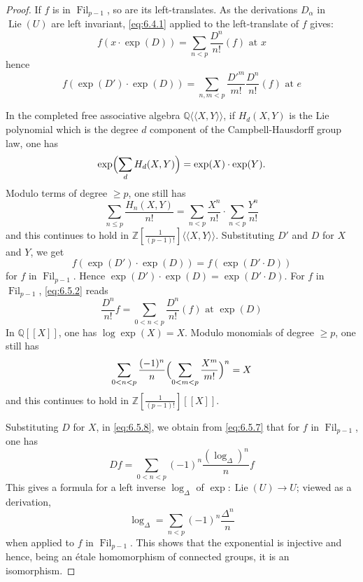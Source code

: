 \documentclass[11pt,a4paper]{article}
\theoremstyle{plain}
\theoremstyle{definition}
\DeclareMathOperator{\Lie}{Lie}
\DeclareMathOperator{\Fil}{Fil}
\newcommand{\ZZ}{\mathbb{Z}}
\newcommand{\QQ}{\mathbb{Q}}
\begin{document}
\begin{proof}
If $f$ is in $\Fil_{p-1}$, so are its left-translates. As the derivations $D_\alpha$ in $\Lie(U)$ are left invariant, \eqref{eq:6.4.1} applied to the left-translate of $f$ gives:
\begin{equation} \label{eq:6.5.2}
f(x \cdot \exp(D)) = \sum_{n < p} \frac{D^n}{n!}(f) \text{ at } x
\end{equation}
hence
\begin{equation} \label{eq:6.5.3}
f(\exp(D') \cdot \exp(D)) = \sum_{n,m < p} \frac{D'^m}{m!} \frac{D^n}{n!}(f) \text{ at } e
\end{equation}

In the completed free associative algebra $\QQ\langle\langle X, Y \rangle\rangle$, if $H_d(X, Y)$ is the Lie polynomial which is the degree $d$ component of the Campbell-Hausdorff group law, one has
\begin{equation} \label{eq:6.5.4}
\exp\Bigl(\sum_d H_d(X, Y)\Bigr) = \exp(X) \cdot \exp(Y).
\end{equation}
Modulo terms of degree $\geq p$, one still has
\begin{equation} \label{eq:6.5.5}
\sum_{n \leq p} \frac{H_n(X,Y)}{n!} = \sum_{n < p} \frac{X^n}{n!} \cdot \sum_{n < p} \frac{Y^n}{n!}
\end{equation}
and this continues to hold in $\ZZ[\frac{1}{(p-1)!}]\langle\langle X, Y \rangle\rangle$. Substituting $D'$ and $D$ for $X$ and $Y$, we get
\begin{equation} \label{eq:6.5.6}
f(\exp(D') \cdot \exp(D)) = f(\exp(D' \cdot D))
\end{equation}
for $f$ in $\Fil_{p-1}$. Hence $\exp(D') \cdot \exp(D) = \exp(D' \cdot D)$. For $f$ in $\Fil_{p-1}$, \eqref{eq:6.5.2} reads
\begin{equation} \label{eq:6.5.7}
\frac{D^n}{n!} f = \sum_{0 < n < p} \frac{D^n}{n!}(f) \text{ at } \exp(D)
\end{equation}
In $\QQ[[X]]$, one has $\log \exp(X) = X$. Modulo monomials of degree $\geq p$, one still has
\begin{equation} \label{eq:6.5.8}
\sum_{0 < n < p} \frac{(-1)^n}{n} \Bigl(\sum_{0 < m < p} \frac{X^m}{m!}\Bigr)^n = X
\end{equation}
and this continues to hold in $\ZZ[\frac{1}{(p-1)!}][[X]]$.

Substituting $D$ for $X$, in \eqref{eq:6.5.8}, we obtain from \eqref{eq:6.5.7} that for $f$ in $\Fil_{p-1}$, one has
\begin{equation} \label{eq:6.5.9}
Df = \sum_{0 < n < p} (-1)^n \frac{(\log_\Delta)^n}{n} f
\end{equation}
This gives a formula for a left inverse $\log_\Delta$ of $\exp : \Lie(U) \to U$; viewed as a derivation,
\begin{equation} \label{eq:6.5.10}
\log_\Delta = \sum_{n < p} (-1)^n \frac{\Delta^n}{n}
\end{equation}
when applied to $f$ in $\Fil_{p-1}$. This shows that the exponential is injective and hence, being an \'etale homomorphism of connected groups, it is an isomorphism.


\end{proof}
\end{document}
